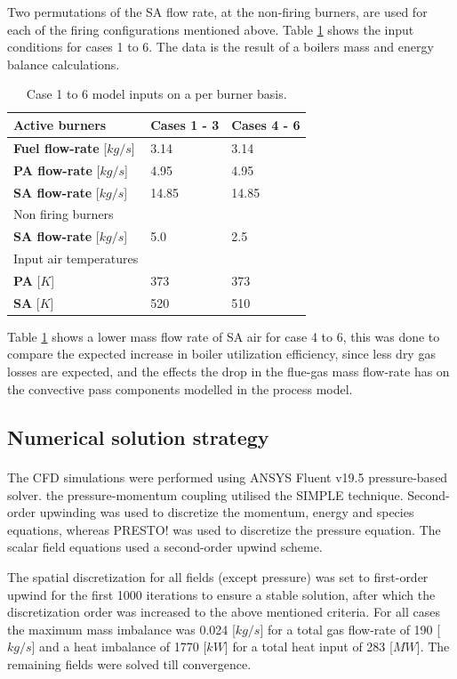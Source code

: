 \documentclass[review]{elsarticle}
\begin{document}
Two permutations of the SA flow rate, at the non-firing burners, are used for each of the firing configurations mentioned above. Table \ref{tbl_case_inputs} shows the input conditions for cases 1 to 6. The data is the result of a boilers mass and energy balance calculations.

\begin{table}[h!]
\centering
\caption{Case 1 to 6 model inputs on a per burner basis.}
\label{tbl_case_inputs}
\vspace{2mm}
{\tabulinesep=1.2mm
\begin{tabularx}{\textwidth}{p{} p{} l}
\hline
Active burners & \textbf{Cases 1 - 3} & \textbf{Cases 4 - 6}\\
\hline
\textbf{Fuel flow-rate} [$kg/s$]&3.14  &3.14\\
\textbf{PA flow-rate} [$kg/s$]&4.95  &4.95\\
\textbf{SA flow-rate} [$kg/s$]&14.85  &14.85\\
\hline
Non firing burners &  & \\
\hline
\textbf{SA flow-rate} [$kg/s$]&5.0  &2.5\\
\hline
Input air temperatures& &\\
\hline
\textbf{PA} [$K$]&373  &373\\
\textbf{SA} [$K$]&520  &510\\
\hline
\end{tabularx}}
\end{table}

Table \ref{tbl_case_inputs} shows a lower mass flow rate of SA air for case 4 to 6, this was done to compare the expected increase in boiler utilization efficiency, since less dry gas losses are expected, and the effects the drop in the flue-gas mass flow-rate has on the convective pass components modelled in the process model. 

\subsection{Numerical solution strategy} 
The CFD simulations were performed using ANSYS Fluent v19.5\textsuperscript{\textregistered} pressure-based solver. the pressure-momentum coupling utilised the SIMPLE technique. Second-order upwinding was used to discretize the momentum, energy and species equations, whereas PRESTO! was used to discretize the pressure equation. The scalar field equations used a second-order upwind scheme.

The spatial discretization for all fields (except pressure) was set to first-order upwind for the first 1000 iterations to ensure a stable solution, after which the discretization order was increased to the above mentioned criteria. For all cases the maximum mass imbalance was 0.024 [$kg/s$] for a total gas flow-rate of 190 [$kg/s$] and a heat imbalance of 1770 [$kW$] for a total heat input of 283 [$MW$]. The remaining fields were solved till convergence.
\end{document}
